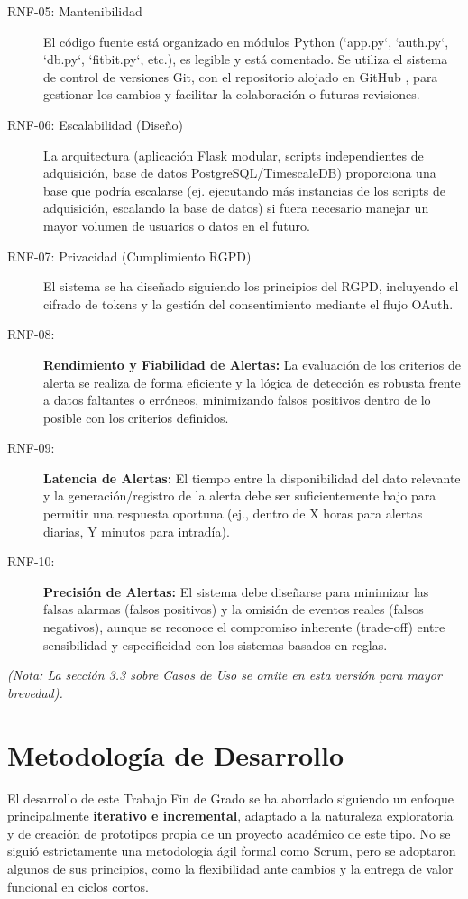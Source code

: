 \begin{description}
    \item[RNF-05: Mantenibilidad] El código fuente está organizado en módulos Python (`app.py`, `auth.py`, `db.py`, `fitbit.py`, etc.), es legible y está comentado. Se utiliza el sistema de control de versiones Git, con el repositorio alojado en GitHub \cite{github_repo_proyecto}, para gestionar los cambios y facilitar la colaboración o futuras revisiones.
    \item[RNF-06: Escalabilidad (Diseño)] La arquitectura (aplicación Flask modular, scripts independientes de adquisición, base de datos PostgreSQL/TimescaleDB) proporciona una base que podría escalarse (ej. ejecutando más instancias de los scripts de adquisición, escalando la base de datos) si fuera necesario manejar un mayor volumen de usuarios o datos en el futuro.
    \item[RNF-07: Privacidad (Cumplimiento RGPD)] El sistema se ha diseñado siguiendo los principios del RGPD, incluyendo el cifrado de tokens y la gestión del consentimiento mediante el flujo OAuth.
    \item[RNF-08:] \textbf{Rendimiento y Fiabilidad de Alertas:} La evaluación de los criterios de alerta se realiza de forma eficiente y la lógica de detección es robusta frente a datos faltantes o erróneos, minimizando falsos positivos dentro de lo posible con los criterios definidos.
    \item[RNF-09:] \textbf{Latencia de Alertas:} El tiempo entre la disponibilidad del dato relevante y la generación/registro de la alerta debe ser suficientemente bajo para permitir una respuesta oportuna (ej., dentro de X horas para alertas diarias, Y minutos para intradía).
    \item[RNF-10:] \textbf{Precisión de Alertas:} El sistema debe diseñarse para minimizar las falsas alarmas (falsos positivos) y la omisión de eventos reales (falsos negativos), aunque se reconoce el compromiso inherente (trade-off) entre sensibilidad y especificidad con los sistemas basados en reglas.
\end{description}

\textit{(Nota: La sección 3.3 sobre Casos de Uso se omite en esta versión para mayor brevedad).}

\section{Metodología de Desarrollo}
\label{sec:metodologia}

El desarrollo de este Trabajo Fin de Grado se ha abordado siguiendo un enfoque principalmente \textbf{iterativo e incremental}, adaptado a la naturaleza exploratoria y de creación de prototipos propia de un proyecto académico de este tipo. No se siguió estrictamente una metodología ágil formal como Scrum, pero se adoptaron algunos de sus principios, como la flexibilidad ante cambios y la entrega de valor funcional en ciclos cortos.

